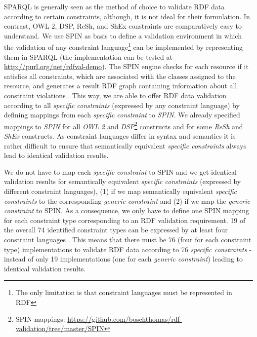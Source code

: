 \documentclass{llncs}
\begin{document}
{SPARQL is generally seen as the method of choice to validate RDF data according to certain constraints, although, it is not ideal for their formulation. 
In contrast, OWL 2, DSP, ReSh, and ShEx constraints are comparatively easy to understand. 
We use SPIN as basis to define a
validation environment in which the validation of any constraint language\footnote{The only limitation is that constraint languages must be represented in RDF} can be implemented by representing them in SPARQL
(the implementation can be tested at \url{http://purl.org/net/rdfval-demo}).
The SPIN engine checks for each resource if it satisfies all constraints, which are associated with the classes assigned to the resource, and generates a result RDF graph containing information about all constraint violations \cite{BoschEckert2014-2}.
This way, we are able to offer RDF data validation according to all \emph{specific constraints} (expressed by any constraint language) by defining mappings from each \emph{specific constraint} to \emph{SPIN}. 
We already specified mappings to \emph{SPIN} for all \emph{OWL 2} and \emph{DSP}\footnote{SPIN mappings: \url{https://github.com/boschthomas/rdf-validation/tree/master/SPIN}} constructs and for some \emph{ReSh} and \emph{ShEx} constructs.
As constraint languages differ in syntax and semantics it is rather difficult to ensure that semantically equivalent \emph{specific constraints} always lead to identical validation results.

We do not have to map each \emph{specific constraint} to SPIN and we get identical validation results for semantically equivalent \emph{specific constraints} (expressed by different constraint languages),
(1) if we map semantically equivalent \emph{specific constraints} to the corresponding \emph{generic constraint} and 
(2) if we map the \emph{generic constraint} to SPIN.
As a consequence, we only have to define one SPIN mapping for each constraint type corresponding to an RDF validation requirement.
19 of the overall 74 identified constraint types can be expressed by at least four constraint languages \cite{BoschNolleAcarEckert2015}.
This means that there must be 76 (four for each constraint type) implementations to validate RDF data according to 76 \emph{specific constraints} - instead of only 19 implementations (one for each \emph{generic constraint}) leading to identical validation results.


}
\end{document}
